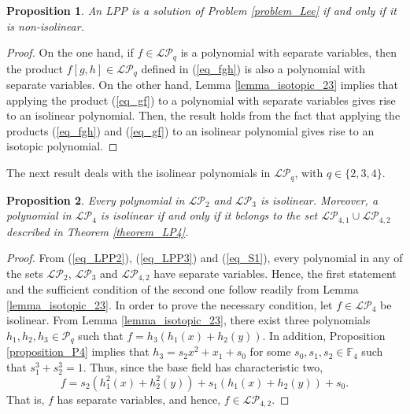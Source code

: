 \documentclass[pdflatex,sn-mathphys-num]{sn-jnl}
\theoremstyle{thmstyleone}%
\newtheorem{proposition}{Proposition}[section]
\begin{document}
\begin{proposition} An LPP is a solution of Problem \ref{problem_Lee} if and only if it is non-isolinear.    
\end{proposition}

\begin{proof} On the one hand, if $f\in\mathcal{LP}_q$ is a polynomial with separate variables, then the product $f[g,h]\in\mathcal{LP}_q$ defined in (\ref{eq_fgh}) is also a polynomial with separate variables. On the other hand, Lemma \ref{lemma_isotopic_23} implies that applying the product (\ref{eq_gf}) to a polynomial with separate variables gives rise to an isolinear polynomial. Then, the result holds from the fact that applying the products (\ref{eq_fgh}) and (\ref{eq_gf}) to an isolinear polynomial gives rise to an isotopic polynomial.    
\end{proof}

\vspace{0.2cm}

The next result deals with the isolinear polynomials in $\mathcal{LP}_q$, with $q\in\{2,3,4\}$.

\begin{proposition}\label{proposition_isolinear} Every polynomial in $\mathcal{LP}_2$ and $\mathcal{LP}_3$ is isolinear. Moreover, a polynomial in $\mathcal{LP}_4$ is isolinear if and only if it belongs to the set $\mathcal{LP}_{4,1}\cup \mathcal{LP}_{4,2}$ described in Theorem \ref{theorem_LP4}.
\end{proposition}

\begin{proof} From (\ref{eq_LPP2}), (\ref{eq_LPP3}) and (\ref{eq_S1}), every polynomial in any of the sets $\mathcal{LP}_2$, $\mathcal{LP}_3$ and $\mathcal{LP}_{4,2}$ have separate variables. Hence, the first statement and the sufficient condition of the second one follow readily from Lemma \ref{lemma_isotopic_23}. In order to prove the necessary condition, let $f\in\mathcal{LP}_4$ be isolinear. From Lemma \ref{lemma_isotopic_23}, there exist three polynomials $h_1,h_2,h_3\in \mathcal{P}_q$ such that $f=h_3(h_1(x)+h_2(y))$. In addition, Proposition \ref{proposition_P4} implies that $h_3=s_2x^2+x_1+s_0$ for some $s_0,s_1,s_2\in\mathbb{F}_4$ such that $s_1^3+s_2^3=1$. Thus, since the base field has characteristic two,
\[f=s_2(h_1^2(x)+h_2^2(y))+s_1(h_1(x)+h_2(y))+s_0.\]
That is, $f$ has separate variables, and hence, $f\in\mathcal{LP}_{4,2}$.    
\end{proof}

\vspace{0.5cm}
\end{document}
